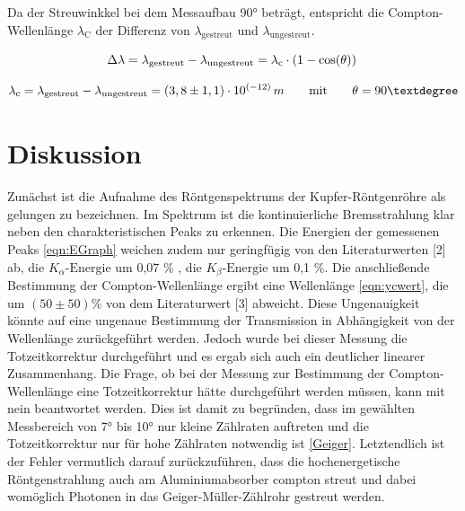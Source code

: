 \documentclass[titlepage = firstcover]{scrartcl}
\begin{document}
        \noindent
        Da der Streuwinkkel bei dem Messaufbau 90° beträgt, entspricht die Compton-Wellenlänge $\lambda_{\text{C}}$ der Differenz von $\lambda_{\text{gestreut}}$
        und $\lambda_{\text{ungestreut}}$.
        
        \begin{equation*}
            \Delta \lambda = \lambda_{\text{gestreut}} - \lambda_{\text{ungestreut}} = \lambda_{\text{c}} \cdot \left(1 -\cos (\theta)\right) \\
            \label{eqn:ycexp}
        \end{equation*}

        \begin{equation}
            \lambda_{\text{c}} = \lambda_{\text{gestreut}} - \lambda_{\text{ungestreut}} = (3,8 \pm 1,1) \cdot 10^{\left(-12\right)} \, m \qquad \text{mit} \qquad \theta=90° \\
            \label{eqn:ycwert}
        \end{equation} 



    \section{Diskussion}
        Zunächst ist die Aufnahme des Röntgenspektrums der Kupfer-Röntgenröhre als gelungen zu bezeichnen. Im Spektrum ist die kontinuierliche Bremsstrahlung 
        klar neben den charakteristischen Peaks zu erkennen. Die Energien der gemessenen Peaks \ref{eqn:EGraph} weichen zudem nur geringfügig von den Literaturwerten [2] ab, 
        die $K_{\alpha}\text{-Energie}$ um 0,07 \% , die $K_{\beta}\text{-Energie}$ um 0,1 \%. Die anschließende Bestimmung der Compton-Wellenlänge ergibt
        eine Wellenlänge \ref{eqn:ycwert}, die um $(50 \pm 50)$\% von dem Literaturwert [3] abweicht. Diese Ungenauigkeit könnte auf eine
        ungenaue Bestimmung der Transmission in Abhängigkeit von der Wellenlänge zurückgeführt werden. Jedoch wurde bei dieser Messung die Totzeitkorrektur
        durchgeführt und es ergab sich auch ein deutlicher linearer Zusammenhang. Die Frage, ob bei der Messung zur Bestimmung der Compton-Wellenlänge eine
        Totzeitkorrektur hätte durchgeführt werden müssen, kann mit nein beantwortet werden. Dies ist damit zu begründen, dass im gewählten Messbereich von 
        7° bis 10° nur kleine Zählraten auftreten und die Totzeitkorrektur nur für hohe Zählraten notwendig ist \ref{Geiger}. Letztendlich ist der Fehler 
        vermutlich darauf zurückzuführen, dass die hochenergetische Röntgenstrahlung auch am Aluminiumabsorber compton streut und dabei womöglich Photonen
        in das Geiger-Müller-Zählrohr gestreut werden.
\end{document}
